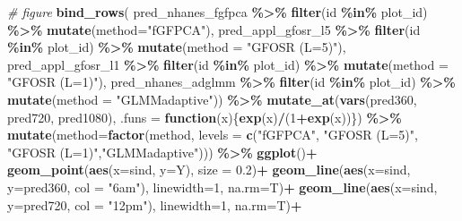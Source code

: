\documentclass[
]{article}
\newenvironment{Shaded}{\begin{snugshade}}{\end{snugshade}}
\newcommand{\AttributeTok}[1]{\textcolor[rgb]{0.13,0.29,0.53}{#1}}
\newcommand{\CommentTok}[1]{\textcolor[rgb]{0.56,0.35,0.01}{\textit{#1}}}
\newcommand{\ControlFlowTok}[1]{\textcolor[rgb]{0.13,0.29,0.53}{\textbf{#1}}}
\newcommand{\DecValTok}[1]{\textcolor[rgb]{0.00,0.00,0.81}{#1}}
\newcommand{\FloatTok}[1]{\textcolor[rgb]{0.00,0.00,0.81}{#1}}
\newcommand{\FunctionTok}[1]{\textcolor[rgb]{0.13,0.29,0.53}{\textbf{#1}}}
\newcommand{\NormalTok}[1]{#1}
\newcommand{\SpecialCharTok}[1]{\textcolor[rgb]{0.81,0.36,0.00}{\textbf{#1}}}
\newcommand{\StringTok}[1]{\textcolor[rgb]{0.31,0.60,0.02}{#1}}
\begin{document}
\begin{Shaded}
\begin{Highlighting}[]
\CommentTok{\# figure}
\FunctionTok{bind\_rows}\NormalTok{(}
\NormalTok{  pred\_nhanes\_fgfpca }\SpecialCharTok{\%\textgreater{}\%} \FunctionTok{filter}\NormalTok{(id }\SpecialCharTok{\%in\%}\NormalTok{ plot\_id) }\SpecialCharTok{\%\textgreater{}\%} \FunctionTok{mutate}\NormalTok{(}\AttributeTok{method=}\StringTok{"fGFPCA"}\NormalTok{),}
\NormalTok{  pred\_appl\_gfosr\_l5 }\SpecialCharTok{\%\textgreater{}\%} \FunctionTok{filter}\NormalTok{(id }\SpecialCharTok{\%in\%}\NormalTok{ plot\_id) }\SpecialCharTok{\%\textgreater{}\%} \FunctionTok{mutate}\NormalTok{(}\AttributeTok{method =} \StringTok{"GFOSR (L=5)"}\NormalTok{),}
\NormalTok{  pred\_appl\_gfosr\_l1 }\SpecialCharTok{\%\textgreater{}\%} \FunctionTok{filter}\NormalTok{(id }\SpecialCharTok{\%in\%}\NormalTok{ plot\_id) }\SpecialCharTok{\%\textgreater{}\%} \FunctionTok{mutate}\NormalTok{(}\AttributeTok{method =} \StringTok{"GFOSR (L=1)"}\NormalTok{),}
\NormalTok{  pred\_nhanes\_adglmm }\SpecialCharTok{\%\textgreater{}\%} \FunctionTok{filter}\NormalTok{(id }\SpecialCharTok{\%in\%}\NormalTok{ plot\_id) }\SpecialCharTok{\%\textgreater{}\%} \FunctionTok{mutate}\NormalTok{(}\AttributeTok{method =} \StringTok{"GLMMadaptive"}\NormalTok{)) }\SpecialCharTok{\%\textgreater{}\%}
  \FunctionTok{mutate\_at}\NormalTok{(}\FunctionTok{vars}\NormalTok{(pred360, pred720, pred1080), }
                \AttributeTok{.funs =} \ControlFlowTok{function}\NormalTok{(x)\{}\FunctionTok{exp}\NormalTok{(x)}\SpecialCharTok{/}\NormalTok{(}\DecValTok{1}\SpecialCharTok{+}\FunctionTok{exp}\NormalTok{(x))\}) }\SpecialCharTok{\%\textgreater{}\%}
  \FunctionTok{mutate}\NormalTok{(}\AttributeTok{method=}\FunctionTok{factor}\NormalTok{(method, }
         \AttributeTok{levels =} \FunctionTok{c}\NormalTok{(}\StringTok{"fGFPCA"}\NormalTok{, }\StringTok{"GFOSR (L=5)"}\NormalTok{, }\StringTok{"GFOSR (L=1)"}\NormalTok{,}\StringTok{"GLMMadaptive"}\NormalTok{))) }\SpecialCharTok{\%\textgreater{}\%}
  \FunctionTok{ggplot}\NormalTok{()}\SpecialCharTok{+}
  \FunctionTok{geom\_point}\NormalTok{(}\FunctionTok{aes}\NormalTok{(}\AttributeTok{x=}\NormalTok{sind, }\AttributeTok{y=}\NormalTok{Y), }\AttributeTok{size =} \FloatTok{0.2}\NormalTok{)}\SpecialCharTok{+}
  \FunctionTok{geom\_line}\NormalTok{(}\FunctionTok{aes}\NormalTok{(}\AttributeTok{x=}\NormalTok{sind, }\AttributeTok{y=}\NormalTok{pred360, }\AttributeTok{col =} \StringTok{"6am"}\NormalTok{), }\AttributeTok{linewidth=}\DecValTok{1}\NormalTok{, }\AttributeTok{na.rm=}\NormalTok{T)}\SpecialCharTok{+}
  \FunctionTok{geom\_line}\NormalTok{(}\FunctionTok{aes}\NormalTok{(}\AttributeTok{x=}\NormalTok{sind, }\AttributeTok{y=}\NormalTok{pred720, }\AttributeTok{col =} \StringTok{"12pm"}\NormalTok{), }\AttributeTok{linewidth=}\DecValTok{1}\NormalTok{, }\AttributeTok{na.rm=}\NormalTok{T)}\SpecialCharTok{+}

\end{Highlighting}
\end{Shaded}
\end{document}
